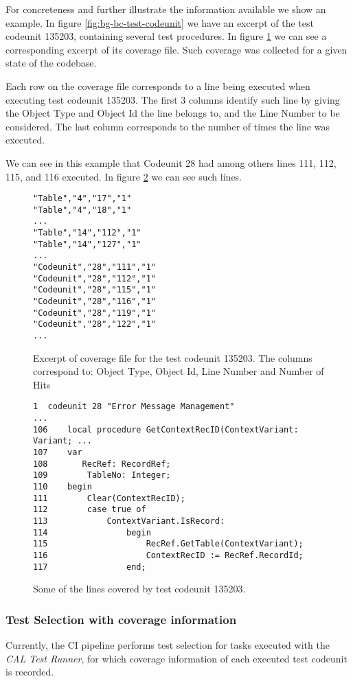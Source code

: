 For concreteness and further illustrate the information available we show an example. In figure \ref{fig:bg-bc-test-codeunit}
we have an excerpt of the test codeunit 135203, containing several test procedures. In figure \ref{fig:bg-bc-coveragefile} we can see
a corresponding excerpt of its coverage file. Such coverage was collected for a given state of the codebase.

Each row on the coverage file corresponds to a line being executed when executing test codeunit 135203. The first 3 columns 
identify such line by giving the Object Type and Object Id the line belongs to, and the Line Number to be considered. The last
column corresponds to the number of times the line was executed. 

We can see in this example that Codeunit 28 had among others lines 111, 112, 115, and 116  executed. In 
figure \ref{fig:bg-bc-covered-file} we can see such lines.

\begin{figure}
    \begin{Verbatim}[fontsize=\small]
"Table","4","17","1"
"Table","4","18","1"
...
"Table","14","112","1"
"Table","14","127","1"
...
"Codeunit","28","111","1"
"Codeunit","28","112","1"
"Codeunit","28","115","1"
"Codeunit","28","116","1"
"Codeunit","28","119","1"
"Codeunit","28","122","1"
...
    \end{Verbatim}
    \caption{Excerpt of coverage file for the test codeunit 135203. The columns correspond to: Object Type, Object Id, Line Number and Number of Hits}
    \label{fig:bg-bc-coveragefile}
\end{figure}

\begin{figure}
    \begin{Verbatim}[fontsize=\small]
1  codeunit 28 "Error Message Management"
...
106    local procedure GetContextRecID(ContextVariant: Variant; ...
107    var
108       RecRef: RecordRef;
109        TableNo: Integer;
110    begin
111        Clear(ContextRecID);
112        case true of
113            ContextVariant.IsRecord:
114                begin
115                    RecRef.GetTable(ContextVariant);
116                    ContextRecID := RecRef.RecordId;
117                end;
    \end{Verbatim}
    \caption{Some of the lines covered by test codeunit 135203.}
    \label{fig:bg-bc-covered-file}
\end{figure}

\subsubsection{Test Selection with coverage information}
Currently, the CI pipeline performs test selection for tasks executed with the \emph{CAL Test Runner},
for which coverage information of each executed test codeunit is recorded.

